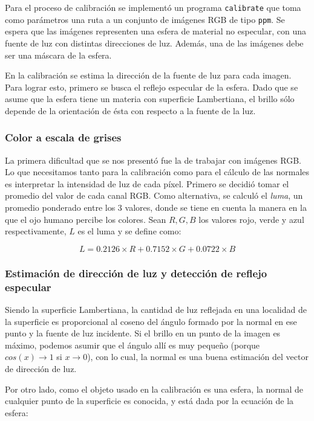 \documentclass{article}
\begin{document}
Para el proceso de calibración se implementó un programa \texttt{calibrate} que toma como parámetros una ruta a un conjunto de imágenes RGB de tipo \texttt{ppm}.  Se espera que las imágenes representen una esfera de material no especular, con una fuente de luz con distintas direcciones de luz.  Además, una de las imágenes debe ser una máscara de la esfera.

En la calibración se estima la dirección de la fuente de luz para cada imagen.  Para lograr esto, primero se busca el reflejo especular de la esfera.  Dado que se asume que la esfera tiene un materia con superficie Lambertiana, el brillo sólo depende de la orientación de ésta con respecto a la fuente de la luz.

\subsubsection{Color a escala de grises}

La primera dificultad que se nos presentó fue la de trabajar con imágenes RGB.  Lo que necesitamos tanto para la calibración como para el cálculo de las normales es interpretar la intensidad de luz de cada píxel.  Primero se decidió tomar el promedio del valor de cada canal RGB.  Como alternativa, se calculó el \textit{luma}, un promedio ponderado entre los 3 valores, donde se tiene en cuenta la manera en la que el ojo humano percibe los colores\cite{BT709}. Sean $R, G, B$ los valores rojo, verde y azul respectivamente, $L$ es el luma y se define como:

$$
L = 0.2126 \times R + 0.7152 \times G + 0.0722 \times B
$$

\subsubsection{Estimación de dirección de luz y detección de reflejo especular}

Siendo la superficie Lambertiana, la cantidad de luz reflejada en una localidad de la superficie es proporcional al coseno del ángulo formado por la normal en ese punto y la fuente de luz incidente.  Si el brillo en un punto de la imagen es máximo, podemos asumir que el ángulo allí es muy pequeño (porque $cos(x) \rightarrow 1$ si $x \rightarrow 0$), con lo cual, la normal es una buena estimación del vector de dirección de luz.

Por otro lado, como el objeto usado en la calibración es una esfera, la normal de cualquier punto de la superficie es conocida, y está dada por la ecuación de la esfera:
\end{document}
